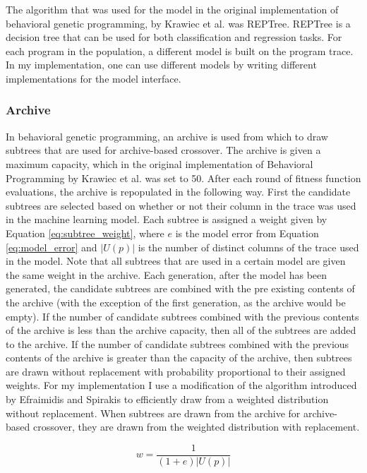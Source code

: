 The algorithm that was used for the model in the original implementation of behavioral genetic programming, by Krawiec et al. was REPTree. \cite{reptree}  REPTree is a decision tree that can be used for both classification and regression tasks.  For each program in the population, a different model is built on the program trace.  In my implementation, one can use different models by writing different implementations for the model interface.

\subsubsection{Archive}
In behavioral genetic programming, an archive is used from which to draw subtrees that are used for archive-based crossover.  The archive is given a maximum capacity, which in the original implementation of Behavioral Programming by Krawiec et al. was set to 50.  After each round of fitness function evaluations, the archive is repopulated in the following way.  First the candidate subtrees are selected based on whether or not their column in the trace was used in the machine learning model.  Each subtree is assigned a weight given by Equation \ref{eq:subtree_weight}, where $e$ is the model error from Equation \ref{eq:model_error} and $|U(p)|$ is the number of distinct columns of the trace used in the model.  Note that all subtrees that are used in a certain model are given the same weight in the archive.  Each generation, after the model has been generated, the candidate subtrees are combined with the pre existing contents of the archive (with the exception of the first generation, as the archive would be empty).  If the number of candidate subtrees combined with the previous contents of the archive is less than the archive capacity, then all of the subtrees are added to the archive.  If the number of candidate subtrees combined with the previous contents of the archive is greater than the capacity of the archive, then subtrees are drawn without replacement with probability proportional to their assigned weights.  For my implementation I use a modification  \cite{samplingnew} of the algorithm introduced by Efraimidis and Spirakis \cite{samplingold} to efficiently draw from a weighted distribution without replacement.  When subtrees are drawn from the archive for archive-based crossover, they are drawn from the weighted distribution with replacement.

\begin{equation}
\label{eq:subtree_weight}
w = \frac{1}{(1 + e)|U(p)|}
\end{equation}

